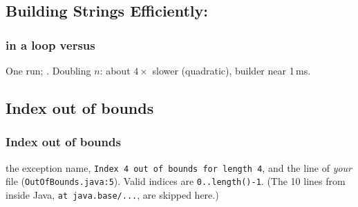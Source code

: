 \documentclass[aspectratio=169,10pt,compress]{beamer}
\begin{document}




\subsection[StringBuilder]{Building Strings Efficiently: }{}{}




\begin{frame}[t,fragile] \frametitle{\hCode{+=} in a loop versus }

  \vspace{0.3em}
  \small One run; . 
  Doubling $n$: 
  \hCode{+=} about $4\times$ slower (quadratic), builder near 1\,ms.
\end{frame}




\subsection[Index]{Index out of bounds}




\begin{frame}[t,fragile] \frametitle{Index out of bounds}

  \small {} the exception name, \texttt{Index 4 out of bounds for length 4}, and the
  line of \emph{your} file (\texttt{OutOfBounds.java:5}). 
  Valid indices are \texttt{0..length()-1}.
  (The 10 lines from inside Java, \texttt{at java.base/...}, are skipped here.)
\end{frame}
\end{document}

